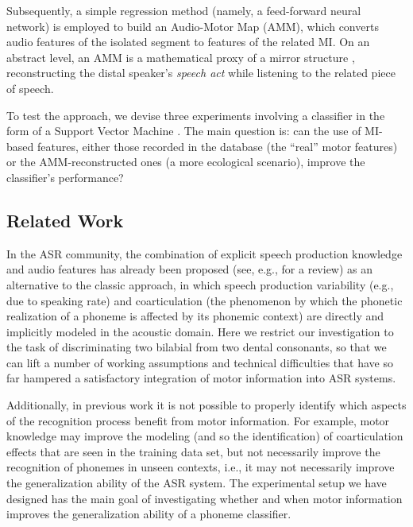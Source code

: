 Subsequently, a simple regression method (namely, a feed-forward neural network) is employed
to build an Audio-Motor Map (AMM), which converts audio features of the isolated segment to
features of the related MI. On an abstract level, an AMM is a mathematical proxy of a mirror
structure \cite{umilta-01}, reconstructing the distal speaker's \emph{speech act} while
listening to the related piece of speech.

To test the approach, we devise three experiments involving a classifier in the form of a
Support Vector Machine \cite{BGV92}. The main question is: can the use of MI-based features,
either those recorded in the database (the ``real'' motor features) or the AMM-reconstructed
ones (a more ecological scenario), improve the classifier's performance?

\subsection{Related Work}

In the ASR community, the combination of explicit speech production knowledge and audio
features has already been proposed (see, e.g., \cite{king} for a review) as an alternative to the
classic approach, in which speech production variability (e.g., due to speaking rate) and
coarticulation (the phenomenon by which the phonetic realization of a phoneme is affected
by its phonemic context) are directly and implicitly modeled in the acoustic domain.
Here we restrict our investigation to the task of discriminating two bilabial from two
dental consonants, so that we can lift a number of working assumptions and technical
difficulties that have so far hampered a satisfactory integration of motor information
into ASR systems.

Additionally, in previous work it is not possible to properly identify which aspects of the
recognition process benefit from motor information. For example, motor knowledge may improve
the modeling (and so the identification) of coarticulation effects that are seen in the training
data set, but not necessarily improve the recognition of phonemes in unseen contexts, i.e., it
may not necessarily improve the generalization ability of the ASR system. The
experimental setup we have designed has the main goal of investigating whether and when motor information
improves the generalization ability of a phoneme classifier.


